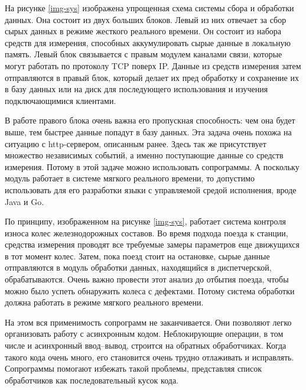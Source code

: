 	На рисунке \ref{img-sys} изображена упрощенная схема системы сбора и обработки данных. Она состоит
	из двух больших блоков. Левый из них отвечает за сбор сырых данных в режиме жесткого реального времени.
	Он состоит из набора средств для измерения, способных аккумулировать сырые данные в локальную память.
	Левый блок связывается с правым модулем каналами связи, которые могут работать по протоколу TCP поверх IP.
	Данные из средств измерения затем отправляются в правый блок, который делает их пред обработку и сохранение
	их в базу данных или на диск для последующего использования и изучения подключающимися клиентами.
	\par
	В работе правого блока очень важна его пропускная способность: чем она будет выше, тем быстрее данные попадут
	в базу данных. Эта задача очень похожа на ситуацию с http-сервером, описанным ранее. Здесь так же
	присутствует множество независимых событий, а именно поступающие данные со средств измерения. 
	Потому в этой задаче можно использовать сопрограммы. А поскольку модуль работает в системе мягкого реального
	времени, то допустимо использовать для его разработки языки с управляемой средой исполнения, вроде Java и Go.
	\par
	По принципу, изображенном на рисунке \ref{img-sys}, работает система контроля износа колес
	железнодорожных составов. Во время подхода поезда к станции, средства измерения проводят все требуемые замеры
	параметров еще движущихся в тот момент колес. Затем, пока поезд стоит на остановке, сырые данные
	отправляются в модуль обработки данных, находящийся в диспетчерской, обрабатываются. Очень важно провести
	этот анализ до отбытия поезда, чтобы можно было успеть обнаружить колеса с дефектами. Потому система
	обработки должна работать в режиме мягкого реального времени.
	\par
	На этом вся применимость сопрограмм не заканчивается. Они позволяют легко организовать работу с 
	асинхронным  кодом.
	Неблокирующие операции, в том числе и асинхронный ввод--вывод, строится на обратных обработчиках.
	Когда такого кода очень много, его становится очень трудно отлаживать и исправлять.
	Сопрограммы помогают избежать такой проблемы, представляя список обработчиков как
	последовательный кусок кода.
	
\clearpage